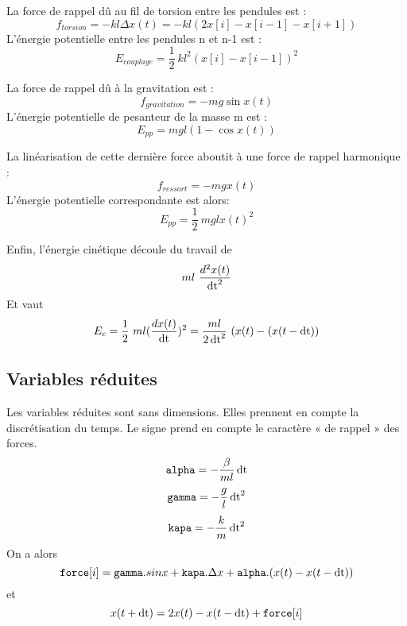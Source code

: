 La force de rappel dû au fil de torsion entre les pendules est :
%
\[
f_{torsion} = -  k l \Delta x(t) = -  k l (2x[i]-x[i-1]-x[i+1])
\]
%
L'énergie potentielle entre les pendules n et n-1 est :
\[
E_{couplage} = \frac{1}{2}\ k l^2 (x[i]-x[i-1])^2
\]

La force de rappel dû à la gravitation est :
%
\[
f_{gravitation} = - m g \sin{x(t)}
\]
L'énergie potentielle de pesanteur de la masse m est :
\[
E_{pp} = m g l (1 - \cos{x(t)})
\]

La linéarisation de cette dernière force aboutit à une force de rappel harmonique :
\[
f_{ressort} = - m g x(t)
\]
L'énergie potentielle correspondante est alors:
\[
E_{pp} = \frac{1}{2}\ m g l x(t)^2
\]

Enfin, l'énergie cinétique découle du travail de 
\[
m l\ \frac{d^2 x(t)}{\operatorname{dt}^2}
\]
%
Et vaut
\[
E_{c} = \frac{1}{2}\ m l (\frac{d x(t)}{\operatorname{dt}})^2 = \frac{m l}{2\operatorname{dt} ^2}\  (x(t)-(x(t-\operatorname{dt}))
\]

%
\subsection{Variables réduites}
%
Les variables réduites sont sans dimensions. Elles prennent en compte la discrétisation du temps. Le signe prend en compte le caractère « de rappel » des forces.
%
\[
\texttt{alpha} =  - \frac{\beta}{ml}\operatorname{dt}
\]
\[
\texttt{gamma} =  - \frac{g}{l}\operatorname{dt}^2
\]
\[
\texttt{kapa} =  - \frac{k}{m}\operatorname{dt}^2
\]
On a alors
\[
	\texttt{force}[i] = \texttt{gamma}.sinx + \texttt{kapa}. \Delta x + \texttt{alpha}.(x(t)-x(t-\operatorname{dt}))
\]
et
\[
	x(t+\operatorname{dt}) = 2 x(t) - x(t-\operatorname{dt}) + \texttt{force}[i]
\]



